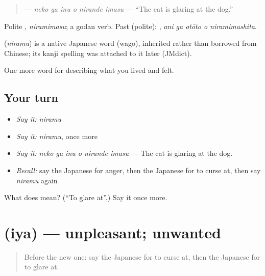 \begin{quote}
\textbf{  } — \emph{neko ga inu o nirande imasu} — \textquotedblleft{}The cat is glaring at the dog.\textquotedblright{}
\end{quote}

Polite \textbf{}, \emph{niramimasu}; a godan verb. Past (polite): \textbf{  }, \emph{ani ga otōto o niramimashita}.

\begin{cousinweb}
\textbf{} (\emph{niramu}) is a native Japanese word (wago), inherited rather than borrowed from Chinese; its kanji spelling was attached to it later (JMdict).
\end{cousinweb}

\begin{grammarlens}[title={What you've built}]
One more word for describing what you lived and felt.
\end{grammarlens}

\subsection*{Your turn}
\begin{itemize}
\raggedright
  \item \emph{Say it:} \emph{niramu}
  \item \emph{Say it:} \emph{niramu}, once more
  \item \emph{Say it:} \emph{neko ga inu o nirande imasu} — The cat is glaring at the dog.
  \item \emph{Recall:} say the Japanese for anger, then the Japanese for to curse at, then say \emph{niramu} again
\end{itemize}

\begin{tcolorbox}[breakable,colback=teal!4,colframe=teal!35!black,title={Before you move on}]
What does  mean? (\textquotedblleft{}To glare at\textquotedblright{}.) Say it once more.
\end{tcolorbox}
\section[\texorpdfstring{\ja{いや} (iya)}{いや (iya)}]{ (iya) — unpleasant; unwanted}

\label{lesson:JA-C430-iya}



\begin{quote}
Before the new one: say the Japanese for to curse at, then the Japanese for to glare at.
\end{quote}

